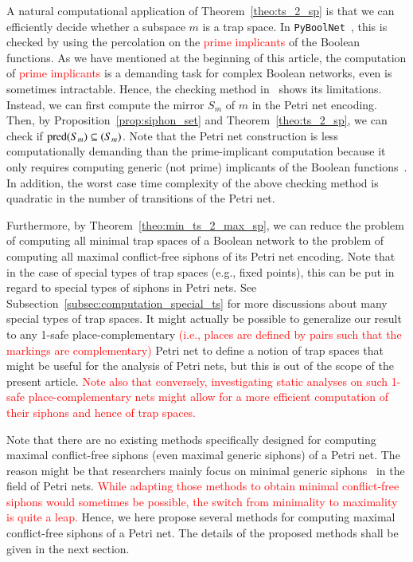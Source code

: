 \documentclass[preprint,12pt]{elsarticle}
\newcommand{\change}[1]{\textcolor{red}{#1}}
\DeclareMathOperator{\pred}{pred}
\let\succ\relax
\DeclareMathOperator{\succ}{succ}
\begin{document}
A natural computational application of Theorem~\ref{theo:ts_2_sp} is that we can efficiently decide whether a subspace \(m\) is a trap space.
In \texttt{PyBoolNet}~\cite{klarner2017pyboolnet}, this is checked by using the percolation on the \change{prime implicants} of the Boolean functions.
As we have mentioned at the beginning of this article, the computation of \change{prime implicants} is a demanding task for complex Boolean networks, even is sometimes intractable.
Hence, the checking method in~\cite{klarner2017pyboolnet} shows its limitations.
Instead, we can first compute the mirror \(S_m\) of \(m\) in the Petri net encoding.
Then, by Proposition~\ref{prop:siphon_set} and Theorem~\ref{theo:ts_2_sp}, we can check if \(\pred(S_m) \subseteq \succ(S_m)\).
Note that the Petri net construction is less computationally demanding than the prime-implicant computation because it only requires computing generic (not prime) implicants of the Boolean functions~\cite{chatain2014characterization}.
In addition, the worst case time complexity of the above checking method is quadratic in the number of transitions of the Petri net.

Furthermore, by Theorem~\ref{theo:min_ts_2_max_sp}, we can reduce the problem of computing all minimal trap spaces of a Boolean network to the problem of computing all maximal conflict-free siphons of its Petri net encoding.
Note that in the case of special types of trap spaces (e.g., fixed points), this can be put in regard to special types of siphons in Petri nets.
See Subsection~\ref{subsec:computation_special_ts} for more discussions about many special types of trap spaces.
It might actually be possible to generalize our result to any 1-safe place-complementary \change{(i.e., places are defined by pairs such that the markings are complementary)} Petri net to define a notion of trap spaces that might be useful for the analysis of Petri nets, but this is out of the scope of the present article.
\change{Note also that conversely, investigating static analyses on such 1-safe place-complementary nets might allow for a more efficient computation of their siphons and hence of trap spaces.}

Note that there are no existing methods specifically designed for computing maximal conflict-free siphons (even maximal generic siphons) of a Petri net.
The reason might be that researchers mainly focus on minimal generic siphons~\cite{DBLP:journals/isci/LiuB16} in the field of Petri nets.
\change{While adapting those methods to obtain minimal conflict-free siphons would sometimes be possible, the switch from minimality to maximality is quite a leap.}
Hence, we here propose several methods for computing maximal conflict-free siphons of a Petri net.
The details of the proposed methods shall be given in the next section.
\end{document}
